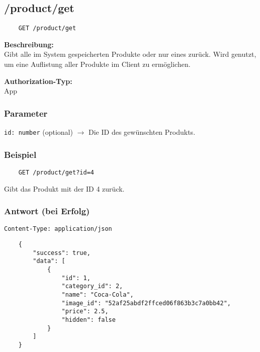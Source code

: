 \subsection{/product/get}

\begin{lstlisting}
    GET /product/get
\end{lstlisting}

\textbf{Beschreibung:} \\
Gibt alle im System gespeicherten Produkte oder nur eines zurück. Wird genutzt, um eine Auflistung aller Produkte im Client zu ermöglichen.

\textbf{Authorization-Typ:} \\
App

\subsubsection{Parameter}

\lstinline{id: number} (optional)
$\rightarrow$ Die ID des gewünschten Produkts.

\subsubsection{Beispiel}

\begin{lstlisting}
    GET /product/get?id=4
\end{lstlisting}

Gibt das Produkt mit der ID 4 zurück.

\subsubsection{Antwort (bei Erfolg)}

\lstinline{Content-Type: application/json}
\begin{lstlisting}
    {
        "success": true, 
        "data": [
            {
                "id": 1,
                "category_id": 2,
                "name": "Coca-Cola",
                "image_id": "52af25abdf2ffced06f863b3c7a0bb42",
                "price": 2.5,
                "hidden": false
            }
        ]
    }
\end{lstlisting}
